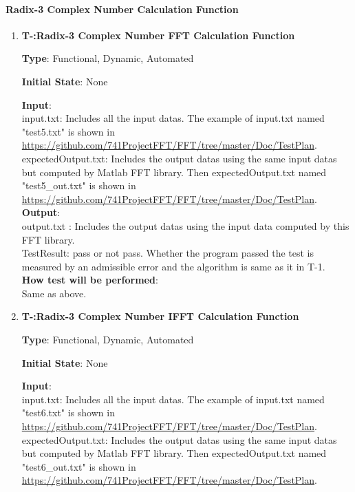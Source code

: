 \documentclass[12pt, titlepage]{article}
\newcounter{tnum}
\begin{document}
\paragraph{Radix-3 Complex Number Calculation Function\\}

\begin{enumerate}

\item{\textbf{T-\thetnum \label{R3CFFT}:Radix-3 Complex  Number FFT Calculation Function}}

\textbf {Type}: Functional, Dynamic, Automated

\textbf {Initial State}: None
					
\textbf {Input}:\\
{\large input.txt}:   Includes all the input datas. The example of input.txt named "test5.txt" is shown in \url{https://github.com/741ProjectFFT/FFT/tree/master/Doc/TestPlan}.\\
{\large expectedOutput.txt}: Includes the output datas using the same input datas but computed by Matlab FFT library. Then expectedOutput.txt named "test5\_out.txt" is shown in \url{https://github.com/741ProjectFFT/FFT/tree/master/Doc/TestPlan}. \\
					
\textbf {Output}: \\{\large output.txt} : Includes the output datas using the input data computed by this FFT library.\\
{\large TestResult}: pass or not pass. Whether the program passed the test is measured by an admissible error and the algorithm is same as it in T-1.\\
		
\textbf {How test will be performed}: \\
Same as above.

\item{\textbf{T-\thetnum \label{R3CIFFT}:Radix-3 Complex Number IFFT Calculation Function}}

\textbf {Type}: Functional, Dynamic, Automated
					
\textbf {Initial State}: None
					
\textbf {Input}:\\
{\large input.txt}: Includes all the input datas. The example of input.txt named "test6.txt" is shown in \url{https://github.com/741ProjectFFT/FFT/tree/master/Doc/TestPlan}.\\
{\large expectedOutput.txt}:  Includes the output datas using the same input datas but computed by Matlab FFT library. Then expectedOutput.txt named "test6\_out.txt" is shown in \url{https://github.com/741ProjectFFT/FFT/tree/master/Doc/TestPlan}.\\


\end{enumerate}
\end{document}

